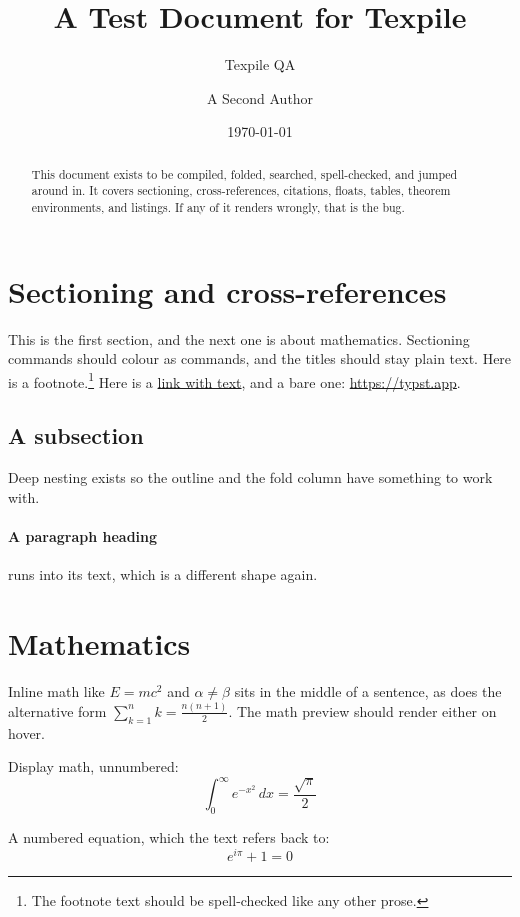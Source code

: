 \documentclass[11pt,a4paper]{article}
\title{A Test Document for Texpile}
\author{Texpile QA \and A Second Author}
\date{\today}
\begin{document}
\maketitle

\begin{abstract}
	This document exists to be compiled, folded, searched, spell-checked, and jumped around
	in. It covers sectioning, cross-references, citations, floats, tables, theorem
	environments, and listings. If any of it renders wrongly, that is the bug.
\end{abstract}

\section{Sectioning and cross-references}
\label{sec:intro}

This is the first section, and the next one is about mathematics. Sectioning commands should
colour as commands, and the titles should stay plain text. Here is a footnote.\footnote{The
footnote text should be spell-checked like any other prose.} Here is a
\href{https://texpile.com}{link with text}, and a bare one: \url{https://typst.app}.

\subsection{A subsection}
\label{sec:sub}

Deep nesting exists so the outline and the fold column have something to work with.

\paragraph{A paragraph heading} runs into its text, which is a different shape again.

\section{Mathematics}
\label{sec:math}

Inline math like $E = mc^2$ and $\alpha \neq \beta$ sits in the middle of a sentence, as does
the alternative form \( \sum_{k=1}^{n} k = \tfrac{n(n+1)}{2} \). The math preview should render
either on hover.

Display math, unnumbered:
\[
	\int_{0}^{\infty} e^{-x^2} \, dx = \frac{\sqrt{\pi}}{2}
\]

A numbered equation, which the text refers back to:
\begin{equation}
	\label{eq:euler}
	e^{i\pi} + 1 = 0
\end{equation}
\end{document}
